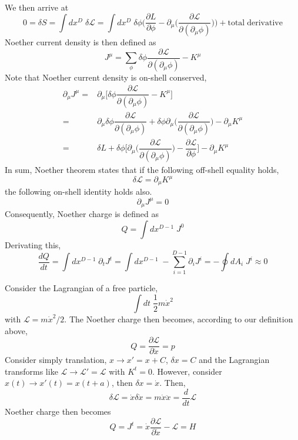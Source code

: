 \begin{defi}
\begin{align*}
\end{align*}
We then arrive at
\[0=\delta S=\int dx^{D}\;\delta \mathcal{L}=\int dx^{D}\;\delta \phi \Big(\dfrac{\partial L}{\partial \phi }-\partial _{\mu }\Big(\dfrac{\partial \mathcal{L}}{\partial (\partial _{\mu }\phi )} \Big) \Big)+\mathrm{total\;derivative}\]
Noether current density is then defined as
\[J^{\mu }=\sum _{\phi }\delta \phi \dfrac{\partial \mathcal{L}}{\partial (\partial _{\mu }\phi )}-K^{\mu } \]
Note that Noether current density is on-shell conserved,
\begin{align*}
	\partial _{\mu }J^{\mu }=&\partial _{\mu }\Big[\delta \phi \dfrac{\partial \mathcal{L}}{\partial (\partial_{\mu }\phi )}-K^{\mu } \Big]\\
=&\partial _{\mu }\delta \phi \dfrac{\partial \mathcal{L}}{\partial (\partial _{\mu }\phi )}+\delta \phi \partial _{\mu }\Big(\dfrac{\partial \mathcal{L}}{\partial (\partial _{\mu }\phi )}\Big)-\partial _{\mu }K^{\mu }\\
=&\delta L+\delta \phi \Big[\partial _{\mu }\Big(\dfrac{\partial \mathcal{L}}{\partial (\partial _{\mu }\phi )} \Big)-\dfrac{\partial \mathcal{L}}{\partial \phi } \Big]-\partial _{\mu }K^{\mu }
\end{align*}
In sum, Noether theorem states that if the following off-shell equality holds,
\[\delta \mathcal{L}=\partial _{\mu }K^{\mu }\]
the following on-shell identity holds also.
\[\partial _{\mu }J^{\mu }=0\]
Consequently, Noether charge is defined as
\[Q=\int  dx^{D-1}\;J^{0}\]
Derivating this, 
\[\dfrac{d Q}{d t}=\int dx^{D-1}\;\partial _{t}J^{t}=\int dx^{D-1}\;-\sum ^{D-1}_{i=1}\partial _{i}J^{i}=-\oint dA_{i}\;J^{i}\approx 0  \]
\end{defi}
\vspace{2ex}
\begin{ex}
Consider the Lagrangian of a free particle,
\[\int dt\;\dfrac{1}{2}m\dot{x}^2\]
with $\mathcal{L}=m\dot{x}^2/2$. The Noether charge then becomes, according to our definition above,
\[Q=\dfrac{\partial \mathcal{L}}{\partial \dot{x}}=p \]
Consider simply translation, $x\rightarrow x'=x+C$, $\delta x=C$ and the Lagrangian transforms like $\mathcal{L}\rightarrow \mathcal{L}'=\mathcal{L}$ with $K^{t}=0$. However, consider $x(t)\rightarrow x'(t)=x(t+a)$, then $\delta x=\dot{x}$. Then,
\[\delta \mathcal{L}=\dot{x}\delta \dot{x}=m\dot{x}\ddot{x}=\dfrac{d }{d t}\mathcal{L} \]
Noether charge then becomes
\[Q=J^{t}=\dot{x}\dfrac{\partial \mathcal{L}}{\partial \dot{x}}-\mathcal{L}=H \]
\end{ex}
\vspace{2ex}

